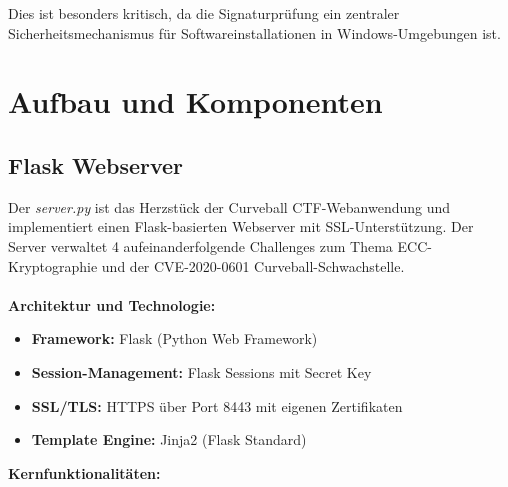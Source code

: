 \documentclass{article}
\begin{document}
Dies ist besonders kritisch, da die Signaturprüfung ein zentraler Sicherheitsmechanismus für Softwareinstallationen in Windows-Umgebungen ist.

\section{Aufbau und Komponenten}
\subsection{Flask Webserver}
Der \emph{server.py} ist das Herzstück der Curveball CTF-Webanwendung und implementiert einen Flask-basierten Webserver mit SSL-Unterstützung. Der Server verwaltet 4 aufeinanderfolgende Challenges zum Thema ECC-Kryptographie und der CVE-2020-0601 Curveball-Schwachstelle.\\
\\
\textbf{Architektur und Technologie:}
\begin{itemize}
    \item \textbf{Framework:} Flask (Python Web Framework)
    \item \textbf{Session-Management:} Flask Sessions mit Secret Key
    \item \textbf{SSL/TLS:} HTTPS über Port 8443 mit eigenen Zertifikaten
    \item \textbf{Template Engine:} Jinja2 (Flask Standard)
\end{itemize}
\textbf{Kernfunktionalitäten:}
\end{document}
